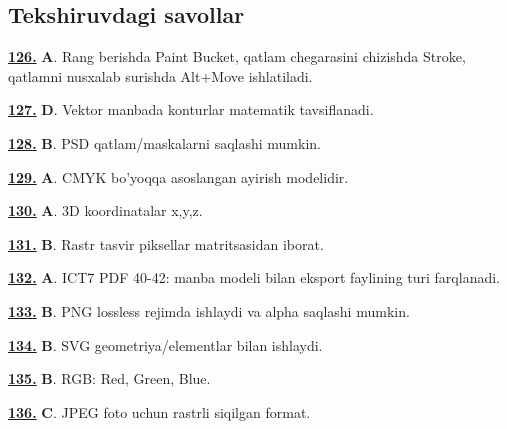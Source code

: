 \documentclass[10pt,a4paper,oneside]{article}
\begin{document}
\subsection{Tekshiruvdagi savollar}
\noindent\hyperlink{q126}{\textbf{126.}} \textbf{A}.  Rang berishda Paint Bucket, qatlam chegarasini chizishda Stroke, qatlamni nusxalab surishda Alt+Move ishlatiladi.
\par\vspace{3mm}
\noindent\hyperlink{q127}{\textbf{127.}} \textbf{D}.  Vektor manbada konturlar matematik tavsiflanadi.
\par\vspace{3mm}
\noindent\hyperlink{q128}{\textbf{128.}} \textbf{B}.  PSD qatlam/maskalarni saqlashi mumkin.
\par\vspace{3mm}
\noindent\hyperlink{q129}{\textbf{129.}} \textbf{A}.  CMYK bo'yoqqa asoslangan ayirish modelidir.
\par\vspace{3mm}
\noindent\hyperlink{q130}{\textbf{130.}} \textbf{A}.  3D koordinatalar x,y,z.
\par\vspace{3mm}
\noindent\hyperlink{q131}{\textbf{131.}} \textbf{B}.  Rastr tasvir piksellar matritsasidan iborat.
\par\vspace{3mm}
\noindent\hyperlink{q132}{\textbf{132.}} \textbf{A}.  ICT7 PDF 40-42: manba modeli bilan eksport faylining turi farqlanadi.
\par\vspace{3mm}
\noindent\hyperlink{q133}{\textbf{133.}} \textbf{B}.  PNG lossless rejimda ishlaydi va alpha saqlashi mumkin.
\par\vspace{3mm}
\noindent\hyperlink{q134}{\textbf{134.}} \textbf{B}.  SVG geometriya/elementlar bilan ishlaydi.
\par\vspace{3mm}
\noindent\hyperlink{q135}{\textbf{135.}} \textbf{B}.  RGB: Red, Green, Blue.
\par\vspace{3mm}
\noindent\hyperlink{q136}{\textbf{136.}} \textbf{C}.  JPEG foto uchun rastrli siqilgan format.
\end{document}
